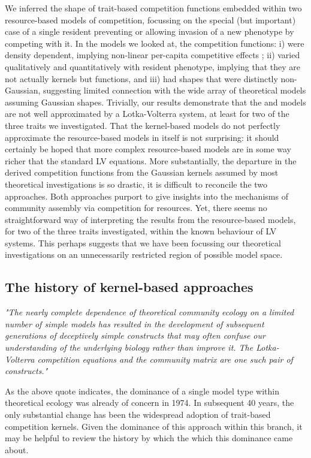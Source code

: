 \documentclass[a4paper,11pt]{article}
\begin{document}
We inferred the shape of trait-based competition functions embedded within
two resource-based models of competition, focussing on the special (but
important) case of a single resident preventing or allowing invasion of a new
phenotype by competing with it. In the models we looked at, the competition
functions: i) were density dependent, implying non-linear per-capita
competitive effects \citep{Abrams-1980}; ii) varied qualitatively and
quantitatively with resident phenotype, implying that they are not actually
kernels but functions, and iii) had shapes that were distinctly non-Gaussian,
suggesting limited connection with the wide array of theoretical models
assuming Gaussian shapes. Trivially, our results demonstrate that the \Rstar
and \plant  models are not well approximated by a Lotka-Volterra system, at
least for two of the three traits we investigated. That the kernel-based models
do not perfectly approximate the resource-based models in itself  is not
surprising: it should certainly be hoped that more complex resource-based models
are in some way richer that the standard LV equations. More substantially, the
departure in the derived competition functions from the Gaussian kernels
assumed by most theoretical investigations is so drastic, it is difficult to
reconcile the two approaches. Both approaches purport to give insights into the 
mechanisms of community assembly via competition for resources. Yet, there seems
no straightforward way of interpreting the results from the resource-based
models, for two of the three traits investigated, within the known behaviour
of LV systems. This perhaps suggests that we have been focussing our
theoretical investigations on an unnecessarily restricted region of possible
model space.

\subsection{The history of kernel-based approaches}

\emph{"The nearly complete dependence of theoretical community ecology on a
limited number of simple models has resulted in the development of subsequent
generations of deceptively simple constructs that may often confuse our
understanding of the underlying biology rather than improve it. The 
Lotka-Volterra competition equations and the community matrix are one such 
pair of constructs."} \citep{Neill-1974}

As the above quote indicates, the dominance of a single model type within
theoretical ecology was already of concern in 1974. In subsequent 40 years,
the only substantial change has been the widespread adoption of trait-based
competition kernels. Given  the dominance of this approach within this branch,
it may be helpful to review the history by which the which this dominance came
about.
\end{document}
